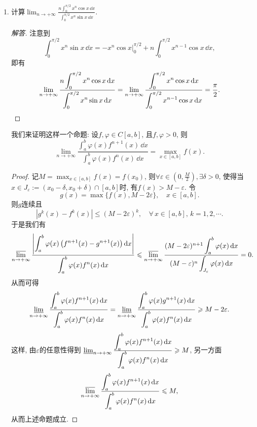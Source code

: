 \begin{quizb}
\begin{enumerate}
\item 计算\(\lim_{n\rightarrow+\infty}\frac{n\displaystyle\int_{0}^{\pi/2}x^n\cos x\,\dd x}
{\displaystyle\int_{0}^{\pi/2}x^n\sin x\,\dd x}.\)
\begin{proof}[解答]
注意到\[\int_{0}^{\pi/2}x^n\sin x\,\dd x
=-x^n\cos x\big|_0^{\pi/2}+n\int_{0}^{\pi/2}x^{n-1}\cos x\,\dd x,\]
即有\[\lim_{n\rightarrow+\infty}\frac{n\displaystyle\int_{0}^{\pi/2}x^n\cos x\,\mathrm{d} x}{\displaystyle\int_{0}^{\pi/2}x^n\sin x\,\mathrm{d} x}
=\lim_{n\rightarrow+\infty}\frac{\displaystyle\int_{0}^{\pi/2}x^n\cos x\,\mathrm{d} x}{\displaystyle\int_{0}^{\pi/2}x^{n-1}\cos x\,\mathrm{d} x}
=\frac{\pi}{2}.\qedhere\]
\end{proof}
我们来证明这样一个命题: 设\(f,\varphi\in C[a,b]\), 且\(f,\varphi>0\), 则
\[\lim_{n\rightarrow+\infty}\frac{\displaystyle\int_{a}^{b}\varphi(x)f^{n+1}(x)\,\dd x}{\displaystyle\int_{a}^{b}\varphi(x)f^n(x)\,\dd x}=\max_{x\in[a,b]}f(x).\]
\begin{proof}
记\(M=\max_{x\in[a,b]}f(x)=f(x_0)\), 则\(\forall\varepsilon\in\left(0,\frac{M}{2}\right),\exists\delta>0\), 
使得当\(x\in J_\varepsilon:=(x_0-\delta,x_0+\delta)\cap[a,b]\)时, 
有\(f(x)>M-\varepsilon\). 令
\[g(x)=\max\{f(x),M-2\varepsilon\},\quad x\in[a,b].\]
则\(g\)连续且\[|g^k(x)-f^k(x)|\leqslant (M-2\varepsilon)^k,\quad\forall\, x\in[a,b],\,k=1,2,\cdots.\]
于是我们有\[\varlimsup_{n\rightarrow+\infty}\frac{\left|\displaystyle\int_{a}^{b}\varphi(x)\left(f^{n+1}(x)-g^{n+1}(x)\right)\mathrm{d} x\right|}{\displaystyle\int_{a}^{b}\varphi(x)f^n(x)\,\mathrm{d} x}
\leqslant\varlimsup_{n\rightarrow+\infty}\frac{(M-2\varepsilon)^{n+1}\displaystyle\int_{a}^{b}\varphi(x)\,\mathrm{d} x}{(M-\varepsilon)^n\displaystyle\int_{J_{\varepsilon}}\varphi(x)\,\mathrm{d} x}=0.\]
从而可得\[\varliminf_{n\rightarrow+\infty}\frac{\displaystyle\int_{a}^{b}\varphi(x)f^{n+1}(x)\,\mathrm{d} x}{\displaystyle\int_{a}^{b}\varphi(x)f^n(x)\,\mathrm{d} x}
=\varliminf_{n\rightarrow+\infty}\frac{\displaystyle\int_{a}^{b}\varphi(x)g^{n+1}(x)\,\mathrm{d} x}{\displaystyle\int_{a}^{b}\varphi(x)f^n(x)\,\mathrm{d} x}\geqslant M-2\varepsilon.\]
这样, 由\(\varepsilon\)的任意性得到
\(\varliminf_{n\rightarrow+\infty}\frac{\displaystyle\int_{a}^{b}\varphi(x)f^{n+1}(x)\,\mathrm{d} x}{\displaystyle\int_{a}^{b}\varphi(x)f^n(x)\,\mathrm{d} x}\geqslant M\), 
另一方面\[\varlimsup_{n\rightarrow+\infty}\frac{\displaystyle\int_{a}^{b}\varphi(x)f^{n+1}(x)\,\mathrm{d} x}{\displaystyle\int_{a}^{b}\varphi(x)f^n(x)\,\mathrm{d} x}\leqslant M,\]
从而上述命题成立.
\end{proof}


\end{enumerate}
\end{quizb}
